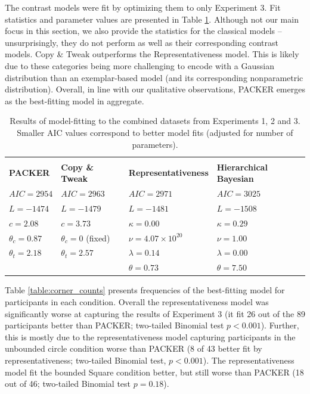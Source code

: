 \documentclass[pdflatex,sn-apa]{sn-jnl}%
\theoremstyle{thmstyleone}%
\theoremstyle{thmstyletwo}%
\theoremstyle{thmstylethree}%
\begin{document}
The contrast models were fit by optimizing them to only Experiment 3. Fit statistics and parameter values are presented
in Table \ref{table:corner-model-fits}. Although not our main focus in this section, we also provide the statistics for
the classical models -- unsurprisingly, they do not perform as well as their corresponding contrast models. Copy \& Tweak outperforms the Representativeness model. This is likely due to these categories being more challenging to encode with a Gaussian distribution than an exemplar-based model (and its corresponding nonparametric distribution). Overall, in line with our qualitative
observations, PACKER emerges as the best-fitting model in aggregate.

\begin{table} \centering
  \caption{Results of model-fitting to the combined datasets from Experiments 1,
    2 and 3. Smaller AIC values correspond to better model fits (adjusted
    for number of parameters).}
\label{table:corner-model-fits}

\begin{tabular}{ l l l l} \\ \\ \textbf{PACKER} & \textbf{Copy \& Tweak} &
\textbf{Representativeness} & \textbf{Hierarchical Bayesian} \\ 
  \hline $AIC = 2954$ &$AIC = 2963$ &$AIC = 2971$  &$AIC = 3025$\\ 
  $L = -1474$          &$L = -1479$   &$L = -1481$    &$L = -1508$\\ 
  $c = 2.08$           &$c = 3.73$    &$\kappa = 0.00$&$\kappa = 0.29$  \\ 
  $\theta_c = 0.87$    &$\theta_c = 0$ (fixed)  &$\nu = 4.07 \times 10^{20}$ &$\nu
                                                                             = 1.00$\\
  $\theta_t = 2.18$    &$\theta_t = 2.57$       &$\lambda = 0.14$ &$\lambda = 0.00$\\
                       &              &$\theta = 0.73$ &$\theta = 7.50$\\
\end{tabular}
\end{table}

Table \ref{table:corner_counts} presents frequencies of the best-fitting model
for participants in each condition. Overall the representativeness model was
significantly worse at capturing the results of Experiment 3 (it fit 26 out of
the 89 participants better than PACKER; two-tailed Binomial test $p < 0.001$).
Further, this is mostly due to the representativeness model capturing participants
in the unbounded circle condition worse than PACKER (8 of 43 better fit by
representativeness; two-tailed Binomial test, $p<0.001$). The representativeness
model fit the bounded Square condition better, but still worse than PACKER (18 out of 46; two-tailed Binomial test $p = 0.18$). 
\end{document}

